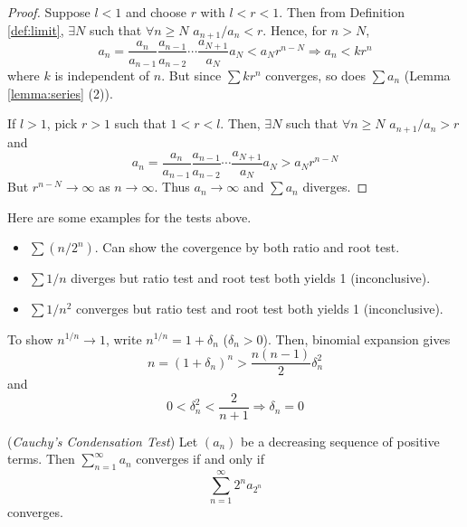 \documentclass[10pt, a4paper, twoside]{report}
\begin{document}
\begin{proof}
   Suppose \(l<1\) and choose \(r\) with \(l<r<1\). Then from Definition \ref{def:limit}, \(\exists N\) such that \(\forall n\geq N\) \(a_{n+1}/a_n<r\). Hence, for \(n>N\),
   \[a_n=\frac{a_n}{a_{n-1}}\frac{a_{n-1}}{a_{n-2}}\cdots\frac{a_{N+1}}{a_{N}}a_N<a_Nr^{n-N}\Rightarrow a_n<kr^n\]
   where \(k\) is independent of \(n\). But since \(\sum kr^n\) converges, so does \(\sum a_n\) (Lemma \ref{lemma:series} (2)).

   If \(l>1\), pick \(r>1\) such that \(1<r<l\). Then, \(\exists N\) such that \(\forall n\geq N\) \(a_{n+1}/a_n>r\) and
   \[a_n=\frac{a_n}{a_{n-1}}\frac{a_{n-1}}{a_{n-2}}\cdots\frac{a_{N+1}}{a_{N}}a_N>a_Nr^{n-N}\]
   But \(r^{n-N}\to\infty\) as \(n\to\infty\). Thus \(a_n\to\infty\) and \(\sum a_n\) diverges.
\end{proof}
Here are some examples for the tests above.
\begin{itemize}
    \item \(\sum(n/2^n)\). Can show the covergence by both ratio and root test.
    \item \(\sum 1/n\) diverges but ratio test and root test both yields 1 (inconclusive).
    \item \(\sum 1/n^2\) converges but ratio test and root test both yields 1 (inconclusive).
\end{itemize}
\begin{remark}
    To show \(n^{1/n}\to 1\), write \(n^{1/n}=1+\delta_n\) (\(\delta_n>0\)). Then, binomial expansion gives
    \[n=(1+\delta_n)^n>\frac{n(n-1)}{2}\delta_n^2\]
    and
    \[0<\delta_n^2<\frac{2}{n+1}\Rightarrow\delta_n=0\]
\end{remark}
\begin{theorem}
    (\emph{Cauchy's Condensation Test}) Let \((a_n)\) be a decreasing sequence of positive terms. Then \(\sum_{n=1}^{\infty}a_n\) converges if and only if
    \[\sum_{n=1}^{\infty}2^na_{2^n}\]
    converges.
    \label{thm:cauchy_condensation_test}
\end{theorem}
\end{document}
